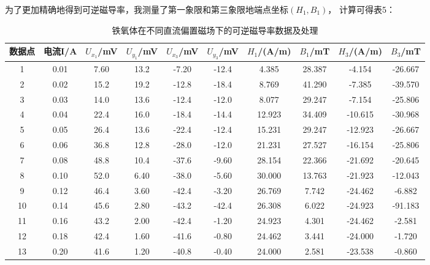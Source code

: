 \documentclass[11pt]{article}
\begin{document}
为了更加精确地得到可逆磁导率，我测量了第一象限和第三象限地端点坐标$(H_1,B_1)$，
计算可得表5：
\begin{table}[H]
    \centering
\begin{tabular}{c|ccccc|cccc}
    \toprule
    数据点 & 电流I/A & $U_{x_1}$/mV & $U_{y_1}$/mV & $U_{x_3}$/mV & $U_{y_3}$/mV & $H_1$/(A/m) & $B_1$/mT & $H_3$/(A/m) & $B_3$/mT \\ \midrule
    1 & 0.01 & 7.60 & 13.2 & -7.20 & -12.4 & 4.385  & 28.387  & -4.154  & -26.667  \\ 
        2 & 0.02 & 15.2 & 19.2 & -12.8 & -18.4 & 8.769  & 41.290  & -7.385  & -39.570  \\ 
        3 & 0.03 & 14.0 & 13.6 & -12.4 & -12.0 & 8.077  & 29.247  & -7.154  & -25.806  \\ 
        4 & 0.04 & 22.4 & 16.0 & -18.4 & -14.4 & 12.923  & 34.409  & -10.615  & -30.968  \\ 
        5 & 0.05 & 26.4 & 13.6 & -22.4 & -12.4 & 15.231  & 29.247  & -12.923  & -26.667  \\ 
        6 & 0.06 & 36.8 & 12.8 & -28.0 & -12.0 & 21.231  & 27.527  & -16.154  & -25.806  \\ 
        7 & 0.08 & 48.8 & 10.4 & -37.6 & -9.60 & 28.154  & 22.366  & -21.692  & -20.645  \\ 
        8 & 0.10 & 52.0 & 6.40 & -38.0 & -5.60 & 30.000  & 13.763  & -21.923  & -12.043  \\ 
        9 & 0.12 & 46.4 & 3.60 & -42.4 & -3.20 & 26.769  & 7.742  & -24.462  & -6.882  \\ 
        10 & 0.14 & 45.6 & 2.80 & -43.2 & -42.4 & 26.308  & 6.022  & -24.923  & -91.183  \\ 
        11 & 0.16 & 43.2 & 2.00 & -42.4 & -1.20 & 24.923  & 4.301  & -24.462  & -2.581  \\ 
        12 & 0.18 & 42.4 & 1.60 & -41.6 & -0.80 & 24.462  & 3.441  & -24.000  & -1.720  \\ 
        13 & 0.20 & 41.6 & 1.20 & -40.8 & -0.40 & 24.000  & 2.581  & -23.538  & -0.860 \\ 
    \bottomrule
\end{tabular}
\caption{铁氧体在不同直流偏置磁场下的可逆磁导率数据及处理}
\end{table}
\end{document}
